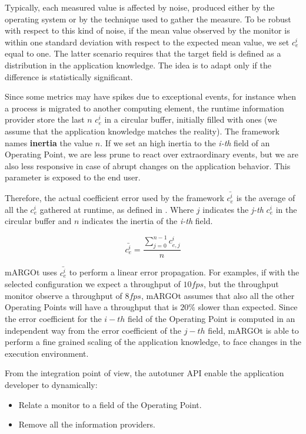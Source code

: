 Typically, each measured value is affected by noise, produced either by the operating system or by the technique used to gather the measure.
To be robust with respect to this kind of noise, if the mean value observed by the monitor is within one standard deviation with respect to the expected mean value, we set $c_{e}^{i}$ equal to one.
The latter scenario requires that the target field is defined as a distribution in the application knowledge.
The idea is to adapt only if the difference is statistically significant.

Since some metrics may have spikes due to exceptional events, for instance when a process is migrated to another computing element, the runtime information provider store the last $n$ $c_{e}^{i}$ in a circular buffer, initially filled with ones (we assume that the application knowledge matches the reality).
The framework names \textbf{inertia} the value $n$.
If we set an high inertia to the \textit{i-th} field of an Operating Point, we are less prune to react over extraordinary events, but we are also less responsive in case of abrupt changes on the application behavior.
This parameter is exposed to the end user.


Therefore, the actual coefficient error used by the framework $\bar{c_{e}^{i}}$ is the average of all the $c_{e}^{i}$ gathered at runtime, as defined in .
Where $j$ indicates the \textit{j-th} $c_{e}^{i}$ in the circular buffer and $n$ indicates the inertia of the \textit{i-th} field.


\begin{equation}
\label{eq:coefficient_error_real}
\bar{c_{e}^{i}}=\dfrac{\sum_{j=0}^{n-1} c_{e,j}^{i}}{n}
\end{equation}


mARGOt uses $\bar{c_{e}^{i}}$ to perform a linear error propagation.
For examples, if with the selected configuration we expect a throughput of $10fps$, but the throughput monitor observe a throughput of $8fps$, mARGOt assumes that also all the other Operating Points will have a throughput that is $20\%$ slower than expected.
Since the error coefficient for the $i-th$ field of the Operating Point is computed in an independent way from the error coefficient of the $j-th$ field, mARGOt is able to perform a fine grained scaling of the application knowledge, to face changes in the execution environment.

From the integration point of view, the autotuner API enable the application developer to dynamically:
\begin{itemize}
	\item Relate a monitor to a field of the Operating Point.
	\item Remove all the information providers.
\end{itemize}






